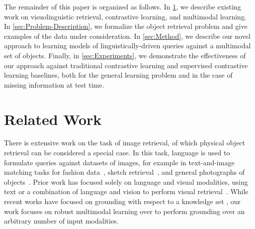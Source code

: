 \documentclass[sigconf,natbib=true,anonymous=true]{acmart}
\newcommand{\todocmi}[1]{\todo[inline,color=green!40]{\small #1 -- Cynthia}}
\begin{document}
The remainder of this paper is organized as follows. In \cref{sec:Related-Work}, we describe existing work on visuolinguistic retrieval, contrastive learning, and multimodal learning. In \cref{sec:Problem-Description}, we formalize the object retrieval problem and give examples of the data under consideration. In \cref{sec:Method}, we describe our novel approach to learning models of linguistically-driven queries against a multimodal set of objects. Finally, in \cref{sec:Experiments}, we demonstrate the effectiveness of our approach against traditional contrastive learning and supervised contrastive learning baselines, both for the general learning problem and in the case of missing information at test time.



\section{Related Work}
\label{sec:Related-Work}

There is extensive work on the task of image retrieval, of which physical object retrieval can be considered a special case. In this task, language is used to formulate queries against datasets of images, for example in text-and-image matching tasks for fashion data~\cite{gao2020fashionbert, wen2021comprehensive}, sketch retrieval~\cite{huang2017deep}, and general photographs of objects~\cite{ma2020large, novak2015large, hong2021gilbert}. Prior work has focused solely on language and visual modalities, using text or a combination of language and vision to perform visual retrieval~\cite{vo2019composing}. While recent works have focused on grounding with respect to a knowledge set \cite{10.1145/3357384.3357889,10.1145/3397271.3401097}, our work focuses on robust multimodal learning over to perform grounding over an arbitrary number of input modalities. 
\end{document}
